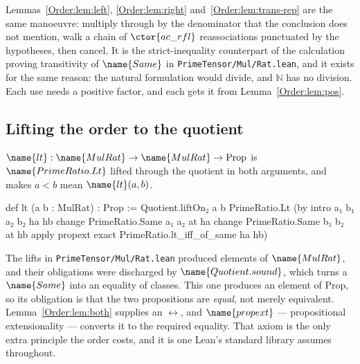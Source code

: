 \begin{remark}\label{Order:rem:pattern}
Lemmas~\ref{Order:lem:left}, \ref{Order:lem:right}
and~\ref{Order:lem:trans-rep} are the same manoeuvre: multiply through by the
denominator that the conclusion does not mention, walk a chain of
$\ctor{ac\_rfl}$ reassociations punctuated by the hypotheses, then cancel.  It
is the strict-inequality counterpart of the calculation proving transitivity of
$\name{Same}$ in \texttt{PrimeTensor/Mul/Rat.lean}, and it exists for the same
reason: the natural formulation would divide, and $\mathbb{N}$ has no
division.  Each use needs a positive factor, and each gets it from
Lemma~\ref{Order:lem:pos}.
\end{remark}

\subsection{Lifting the order to the quotient}

\begin{definition}
\label{Order:def:lt}
$\name{lt} : \name{MulRat} \to \name{MulRat} \to \mathrm{Prop}$ is
$\name{PrimeRatio.Lt}$ lifted through the quotient in both arguments, and
 makes $a < b$ mean $\name{lt}(a,b)$.
\end{definition}

\begin{leancode}
def lt (a b : MulRat) : Prop :=
  Quotient.liftOn₂ a b
    PrimeRatio.Lt
    (by
      intro a₁ b₁ a₂ b₂ ha hb
      change PrimeRatio.Same a₁ a₂ at ha
      change PrimeRatio.Same b₁ b₂ at hb
      apply propext
      exact PrimeRatio.lt_iff_of_same ha hb)
\end{leancode}

\begin{remark}\label{Order:rem:propext}
The lifts in \texttt{PrimeTensor/Mul/Rat.lean} produced elements of
$\name{MulRat}$, and their obligations were discharged by
$\name{Quotient.sound}$, which turns a $\name{Same}$ into an equality of
classes.  This one produces an element of $\mathrm{Prop}$, so its obligation is
that the two propositions are \emph{equal}, not merely equivalent.
Lemma~\ref{Order:lem:both} supplies an $\leftrightarrow$, and
$\name{propext}$ --- propositional extensionality --- converts it to the
required equality.  That axiom is the only extra principle the order costs,
and it is one Lean's standard library assumes throughout.
\end{remark}


